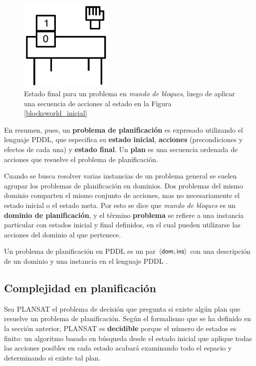 \begin{figure}[h!]
\centering
\includegraphics[width=0.4\textwidth]{figuras/blocksworld_final.png}
\caption[Estado final en \textit{mundo de bloques}]{Estado final para un problema en \textit{mundo de bloques},
luego de aplicar una secuencia de acciones al estado en la Figura
\ref{blocksworld_inicial}}
\label{blocksworld_final}
\end{figure}

En resumen, pues, un \textbf{problema de planificación} es expresado utilizando
el lenguaje PDDL, que especifica su \textbf{estado inicial}, \textbf{acciones}
(precondiciones y efectos de cada una) y \textbf{estado final}.
Un \textbf{plan} es una secuencia ordenada de acciones que resuelve el problema
de planificación.

Cuando se busca resolver varias instancias de un problema general se suelen
agrupar los problemas de planificación en dominios. Dos problemas del mismo
dominio comparten el mismo conjunto de acciones, mas no necesariamente el
estado inicial o el estado meta. Por esto se dice que \textit{mundo de bloques}
es un \textbf{dominio de planificación}, y el término \textbf{problema} se refiere a
una instancia particular con estados inicial y final definidos, en
el cual pueden utilizarse las acciones del dominio al que pertenece.


Un problema de planificación en PDDL es un par $\langle \mathsf{dom},\mathsf{ins} \rangle$ con
una descripción de un dominio y una instancia en el lenguaje PDDL
\cite{mcdermott:pddl,fox:pddl}.
\subsection{Complejidad en planificación}
\label{complejidad_planificacion}
Sea PLANSAT el problema de decisión que pregunta si existe algún plan que
resuelve un problema de planificación. Según el formalismo que se ha definido
en la sección anterior,
PLANSAT es \textbf{decidible} porque el número de estados es finito:
un algoritmo basado en búsqueda desde el estado inicial que aplique
todas las acciones posibles en cada estado acabará examinando todo el espacio y
determinando si existe tal plan.

